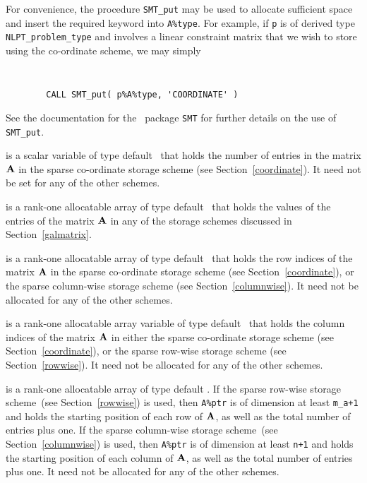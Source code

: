 \documentclass{galahad}
\begin{document}
\begin{description}
\begin{description}
For convenience, the procedure {\tt SMT\_put} 
may be used to allocate sufficient space and insert the required keyword
into {\tt A\%type}.
For example, if {\tt p} is of derived type {\tt NLPT\_problem\_type}
and involves a linear constraint matrix that we wish to store using the co-ordinate scheme,
we may simply
{\tt 
\begin{verbatim}
        CALL SMT_put( p%A%type, 'COORDINATE' )
\end{verbatim}
}
\noindent
See the documentation for the \galahad\ package {\tt SMT} 
for further details on the use of {\tt SMT\_put}.

 is a scalar variable of type default \integer\ that holds
the number of entries in the matrix ${\mathbf{A}}$ in the sparse co-ordinate
storage scheme (see Section~\ref{coordinate}).  It need not be set for
any of the other schemes.

 is a rank-one allocatable array of type default \realdp\ that holds
the values of the entries of the matrix ${\mathbf{A}}$ in any of the 
storage schemes discussed in Section~\ref{galmatrix}.

 is a rank-one allocatable array of type default \integer\
that holds the row indices of the matrix ${\mathbf{A}}$ in the sparse
co-ordinate storage scheme (see Section~\ref{coordinate}), or the
sparse column-wise storage scheme (see Section~\ref{columnwise}).  It
need not be allocated for any of the other schemes.

 is a rank-one allocatable array variable of type default
\integer\ that holds the column indices of the matrix ${\mathbf{A}}$ in
either the sparse co-ordinate storage scheme (see Section~\ref{coordinate}), or the
sparse row-wise storage scheme (see Section~\ref{rowwise}).  It need
not be allocated for any of the other schemes.

 is a rank-one allocatable array of type default \integer.
If the sparse row-wise storage scheme~(see Section~\ref{rowwise}) is used,
then {\tt A\%ptr} is of dimension at least {\tt m\_a+1} and holds the
starting position of each row of ${\mathbf{A}}$, as well as the total number
of entries plus one.  If the sparse column-wise storage scheme~(see
Section~\ref{columnwise}) is used, then {\tt A\%ptr} is of dimension
at least {\tt n+1} and holds the starting position of each column of ${\mathbf{A}}$, as well as
the total number of entries plus one.  It need not be allocated for
any of the other schemes.


\end{description}
\end{description}
\end{document}

